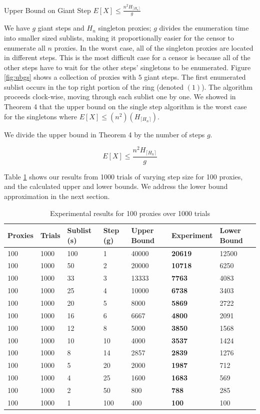 \label{UBGS}
\begin{theorem}{Upper Bound on Giant Step $E[X] \leq \frac{n^2H_{\lceil{H_n}\rceil}}{g}$} 
\end{theorem}

We have $g$ giant steps and $H_n$ singleton proxies; $g$ divides the enumeration time into smaller sized sublists, making it proportionally easier for the censor to enumerate all $n$ proxies. In the worst case, all of the singleton proxies are located in different steps. This is the most difficult case for a censor is because all of the other steps have to wait for the other steps' singletons to be enumerated. Figure \ref{fig:ubgs} shows a collection of proxies with $5$ giant steps. The first enumerated sublist occurs in the top right portion of the ring (denoted $(1)$). The algorithm proceeds clock-wise, moving through each sublist one by one. We showed in Theorem 4 that the upper bound on the single step algorithm is the worst case for the singletons where $E[X] \leq (n^2) (H_{\lceil{H_n}\rceil})$.

We divide the upper bound in Theorem 4 by the number of steps $g$.

$$E[X] \leq \frac{ n^2H_{\lceil{H_n}\rceil}}{g}$$

Table \ref{tab:enumn100} shows our results from 1000 trials of varying step size for 100 proxies, and the calculated upper and lower bounds. We address the lower bound approximation in the next section.

\begin{table}[t]
\begin{tabular}{l|l|l|l|l|l|l}
             Proxies & Trials & Sublist (s) & Step (g) & Upper Bound & Experiment & Lower Bound  \\
\hline
\hline
100 & 1000 & 100 & 1 & 40000 & \textbf{20619} & 12500 \\\hline
100 & 1000 & 50 & 2 & 20000 & \textbf{10718}	& 6250 \\\hline
100 & 1000 & 33 & 3 & 13333	& \textbf{7763} & 4083 \\\hline
100 & 1000 & 25 & 4 & 10000 & \textbf{6738} & 3403 \\\hline
100 & 1000 & 20 & 5 & 8000 & \textbf{5869} & 2722\\\hline
100 & 1000 & 16 & 6 & 6667 & \textbf{4800} & 2091 \\\hline
100 & 1000 & 12 & 8 & 5000 & \textbf{3850} & 1568\\\hline
100 & 1000 & 10 & 10 & 4000	& \textbf{3537} & 1424\\\hline
100 & 1000 & 8 & 14 & 2857 & \textbf{2839} & 1276\\\hline
100 & 1000 & 5 & 20 & 2000 & \textbf{1987} & 712\\\hline
100 & 1000 & 4 & 25 & 1600 & \textbf{1683} & 569\\\hline
100 & 1000 & 2 & 50 & 800 & \textbf{788} & 285\\\hline
100 & 1000 & 1 & 100 & 400 & \textbf{100} & 100\\\hline

\end{tabular}
\caption{Experimental results for 100 proxies over 1000 trials\label{tab:enumn100} }
\end{table}

